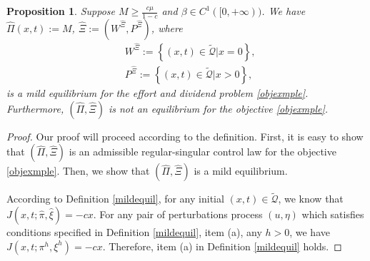 \documentclass[11pt,reqno]{article}%
\newtheorem{proposition}[theorem]{Proposition}
\numberwithin{equation}{section}
\begin{document}
\begin{proposition}\label{toyeg}
Suppose $M\ge \frac{c\mu}{1-c}$ and $\beta\in C^1([0,+\infty))$. We have $\hat\Pi(x,t):=M$, $\hat\Xi:=\left(W^{\hat{\Xi}},P^{\hat{\Xi}}\right)$, where
\begin{equation}
\begin{aligned}
&W^{\hat{\Xi}}:=\left\{(x,t)\in\mathcal{\tilde{Q}}|x=0\right\},\\
&P^{\hat{\Xi}}:=\left\{(x,t)\in\mathcal{\tilde{Q}}|x>0\right\},
\end{aligned}\nonumber
\end{equation}
is a mild equilibrium for the effort and dividend problem \eqref{objexmple}. Furthermore, $\left(\hat\Pi,\hat\Xi\right)$ is not an equilibrium for the objective \eqref{objexmple}.
\end{proposition} 
\begin{proof}
Our proof will proceed according to the definition. First, it is easy to show that $\left(\hat\Pi,\hat\Xi\right)$ is an admissible regular-singular control law for the objective \eqref{objexmple}. Then, we show that $\left(\hat\Pi,\hat\Xi\right)$ is a mild equilibrium.

According to Definition \ref{mildequil}, for any initial $(x,t)\in\mathcal{\tilde{Q}}$, we know that $J(x, t; \hat\pi,\hat\xi)=-cx$. For any pair of perturbations process $(u,\eta)$ which satisfies conditions specified in Definition \ref{mildequil}, item (a), any $h>0$, we have $J(x, t; \pi^h,\xi^h)=-cx$. Therefore, item (a) in Definition \ref{mildequil} holds. 


\end{proof}
\end{document}
